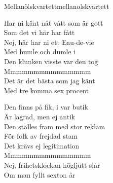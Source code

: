 \begin{song}{Mellanölskvartett}{mellanolskvartett}
\begin{vers}
Har ni känt nåt vått som är gott\\
Som det vi här har fått\\
Nej, här har ni ett Eau-de-vie\\
Med humle och dumle i\\
Den klunken visste var den tog\\
Mmmmmmmmmmmmmmm\\
Det är det bästa som jag känt\\
Med tre komma sex procent\\
\end{vers}
\begin{vers}
Den finns på fik, i var butik\\
Är lagrad, men ej antik\\
Den ställes fram med stor reklam\\
För folk av frejdad stam\\
Det krävs ej legitimation\\
Mmmmmmmmmmmmmmm\\
Nej, frihetsklockan högljutt slår\\
Om man fyllt sexton år\\
\end{vers}
\end{song}
